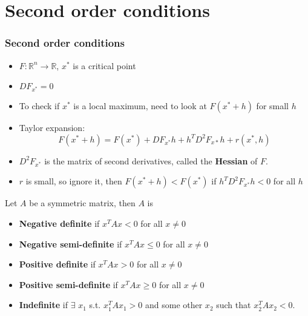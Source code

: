 \documentclass[compress]{beamer}
\def\R{\mathbb{R}}
\renewcommand{\to}{{\rightarrow}}
\begin{document}
\section{Second order conditions}

\begin{frame}\frametitle{Second order conditions}
  \begin{itemize}
  \item $F:\R^n \to \R$, $x^*$ is a critical
    point
  \item $DF_{x^*} = 0$
  \item To check if $x^*$ is a local maximum,
    need to look at $F(x^* + h)$ for small $h$
  \item Taylor expansion:
    \[ F(x^*+h) = F(x^*) + DF_{x^*} h + h^T D^2 F_{x*} h + r(x^*,h) \]
  \item $D^2 F_{x^*}$ is the matrix of second derivatives, called the
    \textbf{Hessian} of $F$.    
  \item $r$ is small, so ignore it, then $F(x^*+h) < F(x^*)$ if
    $h^T D^2 F_{x^*} h < 0$ for all $h$
  \end{itemize}
\end{frame}

\begin{frame}
  \begin{definition}
    Let $A$ be a symmetric matrix, then $A$ is
    \begin{itemize}
    \item \textbf{Negative definite} if $x^T A x < 0$ for all $x \neq 0$
    \item \textbf{Negative semi-definite} if $x^T A x \leq 0$ for all $x \neq 0$
    \item \textbf{Positive definite} if $x^T A x > 0$ for all $x \neq 0$
    \item \textbf{Positive semi-definite} if $x^T A x \geq 0$ for all $x
      \neq 0$
    \item \textbf{Indefinite} if $\exists$ $x_1$ s.t. $x_1^T A x_1 > 0$ and
      some other $x_2$ such that $x_2^T A x_2 < 0$.
    \end{itemize}  
  \end{definition}
\end{frame}
\end{document}
